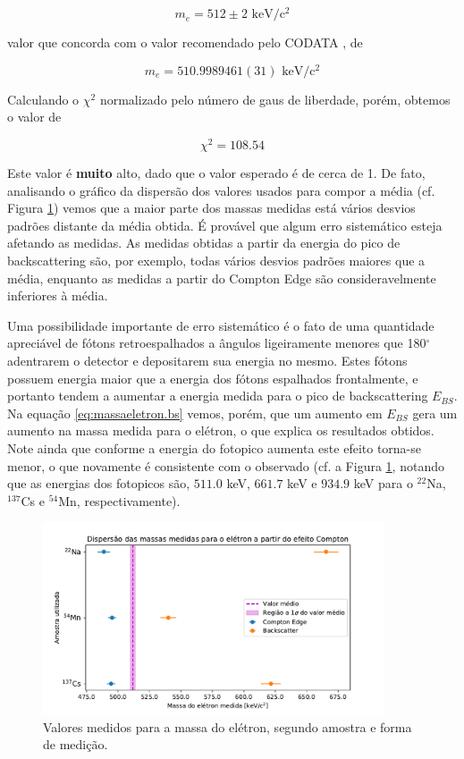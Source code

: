 \documentclass[a4paper, 11pt, notitlepage]{article}
\numberwithin{equation}{section}  %
\begin{document}
$$ m_e = 512 \pm 2 \text{ keV/c$^2$} $$

\noindent valor que concorda com o valor recomendado pelo CODATA \cite{codata2014}, de 

$$ m_e = 510.9989461(31) \text{ keV/c$^2$} $$

Calculando o $\chi^2$ normalizado pelo número de gaus de liberdade, porém, obtemos o valor de

$$ \chi^2 = 108.54 $$

Este valor é \textbf{muito} alto, dado que o valor esperado é de cerca de 1. De fato, analisando o gráfico da dispersão dos valores usados para compor a média (cf. Figura \ref{fig:dispersao.massas}) vemos que a maior parte dos massas medidas está vários desvios padrões distante da média obtida. É provável que algum erro sistemático esteja afetando as medidas. As medidas obtidas a partir da energia do pico de backscattering são, por exemplo, todas vários desvios padrões maiores que a média, enquanto as medidas a partir do Compton Edge são consideravelmente inferiores à média. 

Uma possibilidade importante de erro sistemático é o fato de uma quantidade apreciável de fótons retroespalhados a ângulos ligeiramente menores que 180$^\circ$ adentrarem o detector e depositarem sua energia no mesmo. Estes fótons possuem energia maior que a energia dos fótons espalhados frontalmente, e portanto tendem a aumentar a energia medida para o pico de backscattering $E_{BS}$. Na equação \eqref{eq:massaeletron.bs} vemos, porém, que um aumento em $E_{BS}$ gera um aumento na massa medida para o elétron, o que explica os resultados obtidos. Note ainda que conforme a energia do fotopico aumenta este efeito torna-se menor, o que novamente é consistente com o observado (cf. a Figura \ref{fig:dispersao.massas}, notando que as energias dos fotopicos são, $511.0$ keV, $661.7$ keV e $934.9$ keV para o ${}^{22}$Na, ${}^{137}$Cs e ${}^{54}$Mn, respectivamente).

\begin{figure}[H]
  \includegraphics[width=0.9\textwidth]{dispersao_massas}
  \caption{Valores medidos para a massa do elétron, segundo amostra e forma de medição.}
  \label{fig:dispersao.massas}
\end{figure}
\end{document}
